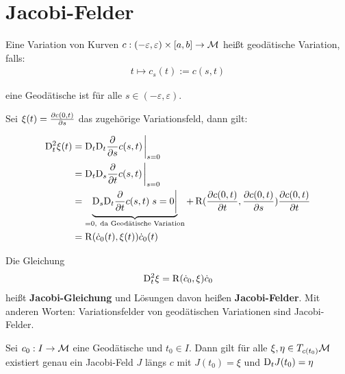 \section{Jacobi-Felder}

\begin{defs}
Eine Variation von Kurven 
$c: (-\varepsilon, \varepsilon) \times [a , b] \to \mathcal{M}$
heißt geodätische Variation, falls:
\begin{align*}
    t \mapsto c_s(t) := c(s, t)
\end{align*}

eine Geodätische ist für alle $s\in (-\varepsilon, \varepsilon)$.
\end{defs}

Sei $\xi (t) = \pdv{c(0,t)}{s}$ das zugehörige Variationsfeld, dann gilt:

\begin{align*}
\covd^2_t \xi (t) &= \covd_t \covd_t \pdv{s} c(s, t) \eval_{s=0}\\
&= \covd_t \covd_s \pdv{t} c(s, t) \eval_{s=0}\\
&= \underbrace{\covd_s \covd_t \pdv{t} c(s, t) \eval{s=0}}_{=0, \ \text{da Geodätische Variation}} + 
\curv (\pdv{c(0, t)}{t} , \pdv{c(0, t)}{s}) \pdv{c(0,t)}{t}\\
&= \curv ( \dot{c}_0 (t) , \xi (t)) \dot{c}_0 (t)
\end{align*}

\begin{defs}
Die Gleichung
\begin{align}
\mathrm{D}^2_t \xi = \operatorname{R} (\dot{c}_0 , \xi ) \dot{c}_0
\end{align}
heißt \textbf{Jacobi-Gleichung} und Lösungen davon heißen
\textbf{Jacobi-Felder}.
Mit anderen Worten: Variationsfelder von geodätischen Variationen sind Jacobi-Felder.
\end{defs}

\begin{satz}
\label{satz:eindeutigkeitjacobi}
Sei $c_0 : I \to \mathcal{M}$ eine Geodätische und $t_0 \in I$.
Dann gilt für alle $\xi, \eta \in T_{c(t_0)}\mathcal{M}$ existiert genau ein Jacobi-Feld $J$ 
längs $c$ mit $J(t_0) = \xi$ und $\mathrm{D}_t J (t_0) = \eta$
\end{satz}

